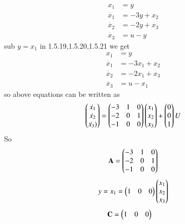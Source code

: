 \begin{enumerate}[label=\thesection.\arabic*.,ref=\thesection.\theenumi]
\begin{align}
x_{1}&=y\\
\dot{x_{1}}&=-3y+x_{2}\\
\dot{x_{2}}&=-2y+x_{3}\\
\dot{x_{3}}&=u-y
\end{align} 
sub $ y=x_{1}$ in 1.5.19,1.5.20,1.5.21 we get
\begin{align}
x_{1}&=y\\
\dot{x_{1}}&=-3x_{1}+x_{2}\\
\dot{x_{2}}&=-2x_{1}+x_{3}\\
\dot{x_{3}}&=u-x_{1}
\end{align} 
so above equations can be written as
\begin{align}
\begin{pmatrix}\dot{x_{1}}\\\dot{x_{2}}\\\dot{x_{3}})\end{pmatrix}
=
\begin{pmatrix}-3&1&0\\-2&0&1\\-1&0&0\end{pmatrix}\begin{pmatrix}x_{1}\\x_{2}\\x_{3}\end{pmatrix}
+
\begin{pmatrix}0\\0\\1\end{pmatrix}  U
\end{align}
So 
\begin{align}
\mathbf{A}=\begin{pmatrix}-3&1&0\\-2&0&1\\-1&0&0\end{pmatrix}
\end{align}
\begin{align}
y=x_{1}
=\begin{pmatrix}1&0&0\end{pmatrix} \begin{pmatrix}x_{1}\\x_{2}\\x_{3}\end{pmatrix}
\end{align}
\begin{align}
\mathbf{C}&=\begin{pmatrix}1&0&0\end{pmatrix}
\end{align}



\end{enumerate}
